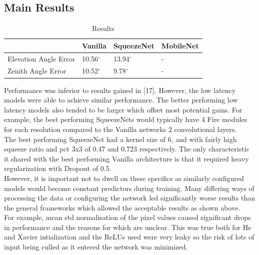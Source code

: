 \documentclass{article}
\begin{document}
\subsection{Main Results}
\begin{table}[h!]
  \begin{center}
    \caption{Results}
    \label{tab:table1}
    \begin{tabular}{l|l|l|l}
      \textbf{} & \textbf{Vanilla} &                          \textbf{SqueezeNet} & \textbf{MobileNet}\\
      \hline
      Elevation Angle Error & 10.56$^{\circ}$ & 13.94$^{\circ}$ & -\\
      Zenith Angle Error & 10.52$^{\circ}$  & 9.78$^{\circ}$ & -\\

    \end{tabular}
  \end{center}
\end{table}

Performance was inferior to results gained in [17]. However, the low latency models were able to achieve similar performance. The better performing low latency models also tended to be larger which offset most potential gains. For example, the best performing SqueezeNets would typically have 4 Fire modules for each resolution compared to the Vanilla networks 2 convolutional layers.\\

The best performing SqueezeNet had a kernel size of 6, and with fairly high squeeze ratio and pct 3x3 of 0.47 and 0.723 respectively. The only characteristic it shared with the best performing Vanilla architecture is that it required heavy regularization with Dropout of 0.5.\\

However, it is important not to dwell on these specifics as similarly configured models would become constant predictors during training. Many differing ways of processing the data or configuring the network led significantly worse results than the general frameworks which allowed the acceptable results as shown above.\\

For example, mean std normalisation of the pixel values caused significant drops in performance and the reasons for which are unclear. This was true both for He and Xavier intialization and the ReLUs used were very leaky so the risk of lots of input being culled as it entered the network was minimized.\\
\end{document}
